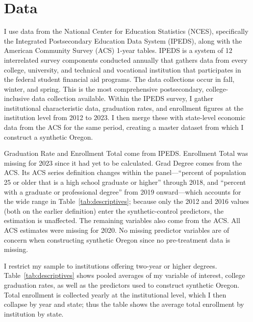 \documentclass[12pt]{article}
\begin{document}
\section{Data}

I use data from the National Center for Education Statistics (NCES),
specifically the Integrated Postsecondary Education Data System (IPEDS),
along with the American Community Survey (ACS) 1-year tables. IPEDS is a
system of 12 interrelated survey components conducted annually that gathers
data from every college, university, and technical and vocational
institution that participates in the federal student financial aid
programs. The data collections occur in fall, winter, and spring. This is
the most comprehensive postsecondary, college-inclusive data collection
available. Within the IPEDS survey, I gather institutional characteristic
data, graduation rates, and enrollment figures at the institution level
from 2012 to 2023. I then merge these with state-level economic data from
the ACS for the same period, creating a master dataset from which I
construct a synthetic Oregon.

\begin{table}[htbp]
\centering
\caption{Descriptive Statistics}
\label{tab:descriptives}

\begin{minipage}{0.95\textwidth}
\vspace{4pt}
\footnotesize
Graduation Rate and Enrollment Total come from IPEDS. Enrollment Total was
missing for 2023 since it had yet to be calculated. Grad Degree comes from
the ACS. Its ACS series definition changes within the panel---``percent of
population 25 or older that is a high school graduate or higher'' through
2018, and ``percent with a graduate or professional degree'' from 2019
onward---which accounts for the wide range in Table~\ref{tab:descriptives};
because only the 2012 and 2016 values (both on the earlier definition) enter
the synthetic-control predictors, the estimation is unaffected. The remaining
variables also come from the ACS. All ACS estimates were missing for 2020. No
missing predictor variables are of concern when constructing synthetic Oregon
since no pre-treatment data is missing.
\end{minipage}
\end{table}

I restrict my sample to institutions offering two-year or higher degrees.
Table~\ref{tab:descriptives} shows pooled averages of my variable of
interest, college graduation rates, as well as the predictors used to
construct synthetic Oregon. Total enrollment is collected yearly at the
institutional level, which I then collapse by year and state; thus the
table shows the average total enrollment by institution by state.
\end{document}

